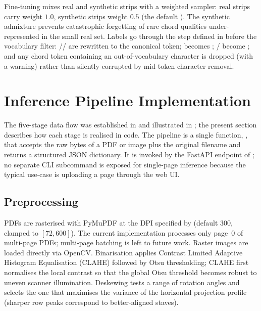 Fine-tuning mixes real and synthetic strips with a weighted sampler:
real strips carry weight $1.0$, synthetic strips weight $0.5$ (the
default ).  The synthetic admixture prevents
catastrophic forgetting of rare chord qualities under-represented in
the small real set.
Labels go through the  step defined in
 before the vocabulary filter:
// are rewritten to the
canonical  token;  becomes
; / become ; and any chord
token containing an out-of-vocabulary character is dropped (with a
warning) rather than silently corrupted by mid-token character
removal.

\section{Inference Pipeline Implementation}
\label{sec:impl-inference}

The five-stage data flow was established in 
and illustrated in ; the present section
describes how each stage is realised in code.
The pipeline is a single function, , that accepts
the raw bytes of a PDF or image plus the original filename and returns
a structured JSON dictionary.
It is invoked by the FastAPI endpoint of ; no
separate CLI subcommand is exposed for single-page inference because
the typical use-case is uploading a page through the web UI.

\subsection{Preprocessing}

PDFs are rasterised with PyMuPDF at the DPI specified by
 (default \num{300}, clamped to $[72, 600]$).
The current implementation processes only page~0 of multi-page PDFs;
multi-page batching is left to future work.
Raster images are loaded directly via OpenCV.
Binarisation applies Contrast Limited Adaptive Histogram Equalisation
(CLAHE) followed by Otsu thresholding; CLAHE first normalises the
local contrast so that the global Otsu threshold becomes robust to
uneven scanner illumination.
Deskewing tests a range of rotation angles and selects the one that
maximises the variance of the horizontal projection profile
(sharper row peaks correspond to better-aligned staves).

